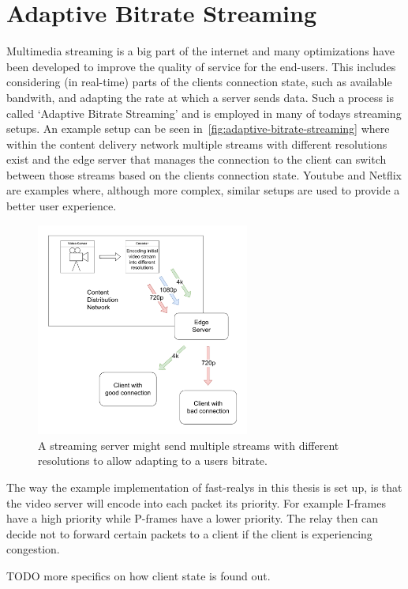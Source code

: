 \section{Adaptive Bitrate Streaming}\label{sec:adaptive_bitrate_streaming}
Multimedia streaming is a big part of the internet and many optimizations have
been developed to improve the quality of service for the end-users.
This includes considering (in real-time) parts of the clients connection state, 
such as available bandwith, and adapting the rate at which a server sends data.
Such a process is called `Adaptive Bitrate Streaming' and is employed in many 
of todays streaming setups.
An example setup can be seen in~\autoref{fig:adaptive-bitrate-streaming} where
within the content delivery network multiple streams with different resolutions
exist and the edge server that manages the connection to the client can switch
between those streams based on the clients connection state.
Youtube and Netflix are examples where, although more complex, similar setups
are used to provide a better user experience. 

\begin{figure}[htbp]
    \centering
    \includegraphics[width=7cm]{figures/02_background/adaptive-bitrate-streaming.drawio.pdf}
    \caption[Adaptive streaming schematic]{A streaming server might send multiple streams with different
    resolutions to allow adapting to a users bitrate.}\label{fig:adaptive-bitrate-streaming}
\end{figure}

The way the example implementation of fast-realys in this thesis is set up,
is that the video server will encode into each packet its priority.
For example I-frames have a high priority while P-frames have a lower
priority.
The relay then can decide not to forward certain packets to a client if
the client is experiencing congestion.

TODO more specifics on how client state is found out.